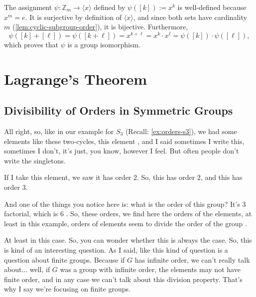 \begin{content}
\begin{steps}
The assignment $\psi \colon \mathbb{Z}_m \to \langle x \rangle$ defined by $\psi([k]) := x^k$ is well-defined because $x^m = e$. It is surjective by definition of $\langle x \rangle$, and since both sets have cardinality $m$ (\cref{lem:cyclic-subgroup-order}), it is bijective. Furthermore,
\[
\psi([k] + [\ell]) = \psi([k + \ell]) = x^{k+\ell} = x^k \cdot x^\ell = \psi([k]) \cdot \psi([\ell]),
\]
which proves that $\psi$ is a group isomorphism.
\end{steps}
\end{content}

\section{Lagrange's Theorem}

\subsection{Divisibility of Orders in Symmetric Groups}

\begin{speech}[00:07:49 - 00:09:18]
All right, so, like in our example for $S_3$ (Recall: \cref{ex:orders-s3}), we had some elements like these two-cycles, this element , and I said sometimes I write this, sometimes I don't, it's just, you know, however I feel. But often people don't write the singletons.

If I take this element, we saw it has order $2$. So, this has order $2$, and this  has order $3$.

And one of the things you notice here is: what is the order of this group? It's $3$ factorial, which is $6$ . So, these orders, we find here the orders of the elements, at least in this example, orders of elements seem to divide the order of the group .

At least in this case. So, you can wonder whether this is always the case. So, this is kind of an interesting question. As I said, like this kind of question is a question about finite groups. Because if $G$ has infinite order, we can't really talk about... well, if $G$ was a group with infinite order, the elements may not have finite order, and in any case we can't talk about this division property. That's why I say we're focusing on finite groups.
\end{speech}

